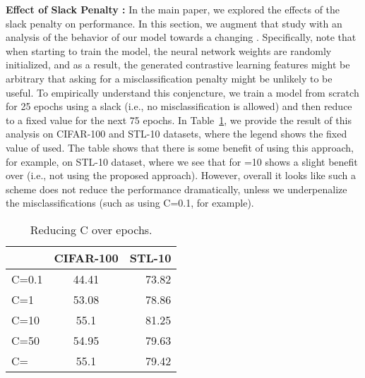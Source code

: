 \documentclass[letterpaper]{article} \usepackage{aaai22}  \usepackage{times}  \usepackage{helvet}  \usepackage{courier}  \usepackage[hyphens]{url}  \usepackage{graphicx} \urlstyle{rm} \def\UrlFont{\rm}  \usepackage{natbib}  \usepackage{caption} \DeclareCaptionStyle{ruled}{labelfont=normalfont,labelsep=colon,strut=off} \frenchspacing  \setlength{\pdfpagewidth}{8.5in}  \setlength{\pdfpageheight}{11in}
\begin{document}
\noindent\textbf{Effect of Slack Penalty :} In the main paper, we explored the effects of the slack penalty  on performance. In this section, we augment that study with an analysis of the behavior of our model towards a changing . Specifically, note that when starting to train the model, the neural network weights are randomly initialized, and as a result, the generated contrastive learning features might be arbitrary that asking for a misclassification penalty might be unlikely to be useful. To empirically understand this conjencture, we train a model from scratch for 25 epochs using a slack  (i.e., no misclassification is allowed) and then reduce  to a fixed value for the next 75 epochs. In Table~\ref{tab: reducing_C}, we provide the result of this analysis on CIFAR-100 and STL-10 datasets, where the legend shows the fixed value of  used. The table shows that there is some benefit of using this approach, for example, on STL-10 dataset, where we see that for =10 shows a slight benefit over  (i.e., not using the proposed approach). However, overall it looks like such a scheme does not  reduce the performance dramatically, unless we underpenalize the misclassifications (such as using C=0.1, for example).

\begin{table}[]
    \centering
    \begin{tabular}{lcr}
    \toprule
      & CIFAR-100 & STL-10 \\
    \midrule
    C=0.1  & 44.41 & 73.82  \\
    C=1  & 53.08 &  78.86  \\
    C=10  & 55.1 &   81.25  \\
    C=50  & 54.95 & 79.63   \\
    C=  & 55.1  & 79.42  \\
    \bottomrule
    \end{tabular}
     \caption{Reducing C over epochs.}
    \label{tab: reducing_C}
\end{table}
\end{document}
